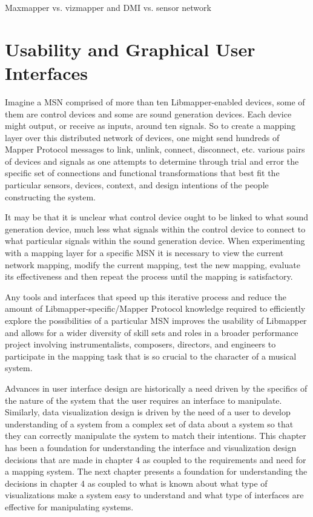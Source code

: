 Maxmapper vs. vizmapper and DMI vs. sensor network

\section{Usability and Graphical User Interfaces}

Imagine a MSN comprised of more than ten Libmapper-enabled devices, some of them are control devices and some are sound generation devices. Each device might output, or receive as inputs, around ten signals. So to create a mapping layer over this distributed network of devices, one might send hundreds of Mapper Protocol messages to link, unlink, connect, disconnect, etc. various pairs of devices and signals as one attempts to determine through trial and error the specific set of connections and functional transformations that best fit the particular sensors, devices, context, and design intentions of the people constructing the system. 

It may be that it is unclear what control device ought to be linked to what sound generation device, much less what signals within the control device to connect to what particular signals within the sound generation device. When experimenting with a mapping layer for a specific MSN it is necessary to view the current network mapping, modify the current mapping, test the new mapping, evaluate its effectiveness and then repeat the process until the mapping is satisfactory. 

Any tools and interfaces that speed up this iterative process and reduce the amount of Libmapper-specific/Mapper Protocol knowledge required to efficiently explore the possibilities of a particular MSN improves the usability of Libmapper and allows for a wider diversity of skill sets and roles in a broader performance project involving instrumentalists, composers, directors, and engineers to participate in the mapping task that is so crucial to the character of a musical system. 

Advances in user interface design are historically a need driven by the specifics of the nature of the system that the user requires an interface to manipulate. Similarly, data visualization design is driven by the need of a user to develop understanding of a system from a complex set of data about a system so that they can correctly manipulate the system to match their intentions. This chapter has been a foundation for understanding the interface and visualization design decisions that are made in chapter 4 as coupled to the requirements and need for a mapping system. The next chapter presents a foundation for understanding the decisions in chapter 4 as coupled to what is known about what type of visualizations make a system easy to understand and what type of interfaces are effective for manipulating systems.
